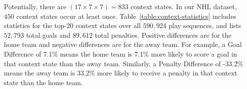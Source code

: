 \documentclass[]{article}
\begin{document}
Potentially, there are $(17 \times 7 \times 7) = 833$ context states. In our NHL dataset, $450$  context states occur at least once.
Table~\ref{table:context-statistics} includes statistics for the top-20 context states over all $590,924$ play sequences, and lists $52,793$ total goals and $89,612$ total penalties.
Positive differences are for the home team and negative differences are for the away team. For example, a Goal Difference of 7.1\% means the home team is 7.1\% more likely to score a goal in that context state than the away team. Similarly, a Penalty Difference of -33.2\% means the away team is 33.2\% more likely to receive a penalty in that context state than the home team.
\end{document}
